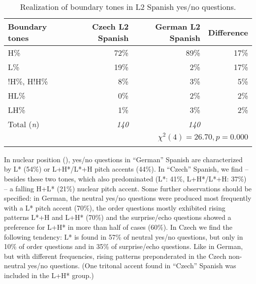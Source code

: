 \begin{table}
\begin{tabularx}{\textwidth}{Qrrr}

\lsptoprule

{Boundary tones} & {Czech L2 Spanish} & {German L2 Spanish} & {Difference}\\
\midrule
H\% &  72\% &  89\% &  17\%\\
L\% &  19\% &  2\% &  17\%\\
!H\%, H!H\% &  8\% &  3\% &  5\%\\
HL\% &  0\% & 2\% &  2\%\\
LH\% &  1\% &  3\% &  2\%\\
\midrule
Total (\textit{n}) & {\itshape 140} & {\itshape 140} &  \\
\\
\lspbottomrule
\end{tabularx}

\caption{Realization of boundary tones in L2 Spanish yes/no questions.}
\label{tab:4.18}
\end{table}

\begin{sloppypar}
In nuclear position (), yes/no questions in “German” Spanish are characterized by L* (54\%) or L+H*/L*+H pitch accents (44\%). In “Czech” Spanish, we find -- besides these two tones, which also predominated (L*: 41\%, L+H*/L*+H: 37\%) -- a falling H+L* (21\%) nuclear pitch accent. Some further observations should be specified: in German, the neutral yes/no questions were produced most frequently with a L* pitch accent (70\%), the order questions mostly exhibited rising patterns L*+H and L+H* (70\%) and the surprise/echo questions showed a preference for L+H* in more than half of cases (60\%). In Czech we find the following tendency: L* is found in 57\% of neutral yes/no questions, but only in 10\% of order questions and in 35\% of surprise/echo questions. Like in German, but with different frequencies, rising patterns preponderated in the Czech non-neutral yes/no questions. (One tritonal accent found in “Czech” Spanish was included in the L+H* group.)
\end{sloppypar}

